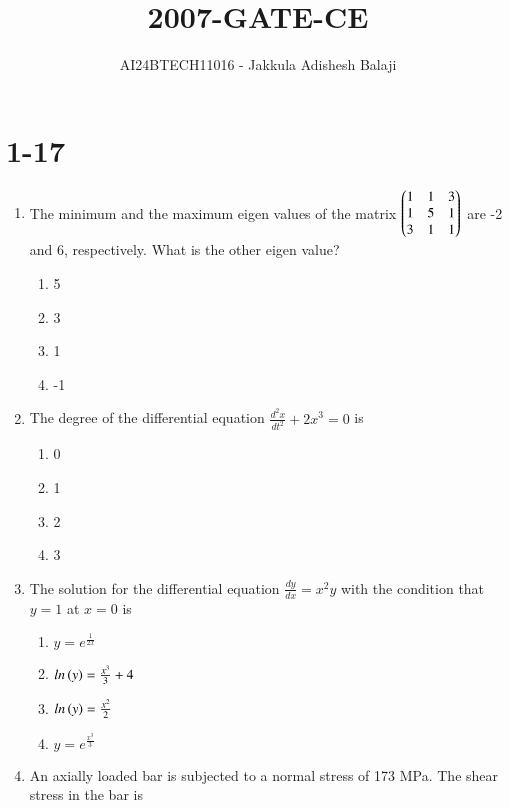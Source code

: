 \documentclass[journal]{IEEEtran}
\begin{document}

\title{2007-GATE-CE}
\author{AI24BTECH11016 - Jakkula Adishesh Balaji}
{\let\newpage\relax\maketitle}

\renewcommand{\thefigure}{\theenumi}
\renewcommand{\thetable}{\theenumi}
\setlength{\intextsep}{10pt} %
\section{1-17}
\begin{enumerate}
	\item
	The minimum and the maximum eigen values of the matrix $\begin{pmatrix}1 & 1 & 3 \\ 1 & 5 & 1 \\ 3 & 1 & 1\end{pmatrix}$ are -2 and 6, respectively. What is the other eigen value?
		\begin{enumerate}
			\item 5
			\item 3
			\item 1
			\item -1
		\end{enumerate}
	\item
	The degree of the differential equation $\frac{d^{2}x}{d{t}^2} + 2x^3 = 0$ is
		\begin{enumerate}
			\item 0
			\item 1
			\item 2
			\item 3
		\end{enumerate}
	\item
	The solution for the differential equation $\frac{dy}{dx} = x^{2}y$ with the condition that $y=1$ at $x=0$ is 
		\begin{enumerate}
			\item $y=e^{\frac{1}{2x}}$
			\item $ln\left(y\right) = \frac{x^3}{3} + 4$
			\item $ln\left(y\right) = \frac{x^2}{2}$
			\item $y = e^{\frac{x^3}{3}}$
		\end{enumerate}
	\item
	An axially loaded bar is subjected to a normal stress of 173 MPa. The shear stress in the bar is
		\begin{enumerate}

\end{enumerate}
\end{enumerate}
\end{document}
